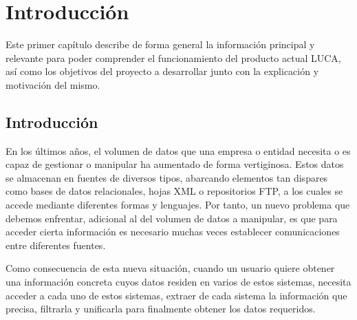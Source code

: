 \chapter{Introducción}
	
Este primer capítulo describe de forma general la información principal y relevante para poder comprender el funcionamiento del producto actual LUCA, así como los objetivos del proyecto a desarrollar junto con la explicación y motivación del mismo.
	
\section{Introducción}
	
	
En los últimos años, el volumen de datos que una empresa o entidad necesita o es capaz de gestionar o manipular ha aumentado de forma vertiginosa. Estos datos se almacenan en fuentes de diversos tipos, abarcando elementos tan dispares como bases de datos relacionales, hojas XML o repositorios FTP, a los cuales se accede mediante diferentes formas y lenguajes. Por tanto, un nuevo problema que debemos enfrentar, adicional al del volumen de datos a manipular, es que para acceder cierta información es necesario muchas veces establecer comunicaciones entre diferentes fuentes.

\vspace{5mm}
			


	 Como consecuencia de esta nueva situación, cuando un usuario	quiere obtener una información concreta cuyos datos residen en varios de estos
sistemas, necesita acceder a cada uno de estos sistemas, extraer de cada sistema la información que precisa, filtrarla y unificarla para finalmente	obtener los datos requeridos.

\vspace{5mm}

